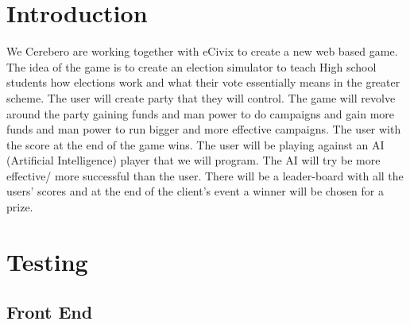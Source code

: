\documentclass{article}
\begin{document}
  
  

  \tableofcontents
  \newpage

\section{Introduction}
	We Cerebero are working together with eCivix to create a new web based game. The idea of the game is to create an election simulator to teach High school students how elections work and what their vote essentially means in the greater scheme. The user will create party that they will control. The game will revolve around the party gaining funds and man power to do campaigns and gain more funds and man power to run bigger and more effective campaigns. The user with the score at the end of the game wins. The user will be playing against an AI (Artificial Intelligence) player that we will program. The AI will try be more effective/ more successful than the user. There will be a leader-board with all the users' scores and at the end of the client's event a winner will be chosen for a prize. 
	


\section{Testing}
	\subsection{Front End}
\end{document}
